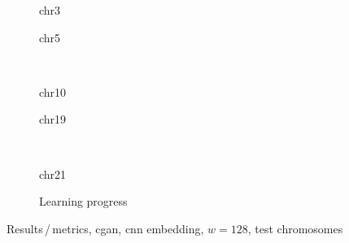 \begin{figure}[p] %
    \begin{subfigure}{0.45\textwidth}
        \scriptsize
        \caption{chr3}
    \end{subfigure} \hfill
    \begin{subfigure}{0.45\textwidth}
        \scriptsize
        \caption{chr5}
    \end{subfigure}\\[5mm]
    \begin{subfigure}{0.45\textwidth}
        \scriptsize
        \caption{chr10}
    \end{subfigure}\hfill
    \begin{subfigure}{0.45\textwidth}
        \scriptsize
        \caption{chr19}
    \end{subfigure}\\[3mm]
    \centering
    \begin{subfigure}{0.45\textwidth}
        \scriptsize
        \caption{chr21}
    \end{subfigure} \hfill
    \begin{subfigure}{0.45\textwidth}
        \scriptsize
        \caption{Learning progress} \label{fig:results:cGAN128_lossEpochs}
    \end{subfigure}
    \caption{Results\,/\,metrics, \acrshort{cgan}, \acrshort{cnn} embedding, $w=128$, test chromosomes}   \label{fig:results:cGAN128_pearson}
\end{figure}

